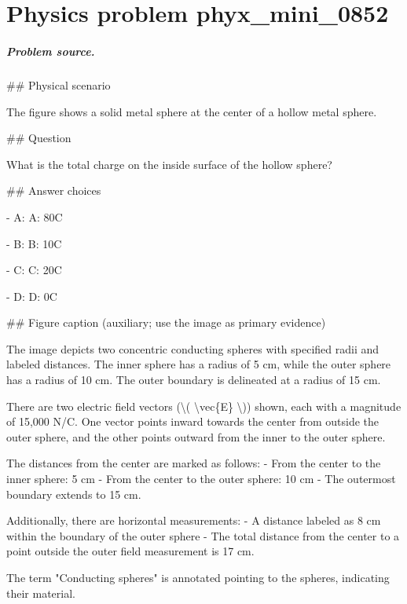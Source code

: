 
\chapter{Physics problem phyx\_mini\_0852}
\label{ch:PhyXMiniProblems_problem_phyx_mini_0852}

\paragraph{Problem source.}
\#\# Physical scenario

The figure shows a solid metal sphere at the center of a hollow metal sphere.

\#\# Question

What is the total charge on the inside surface of the hollow sphere?

\#\# Answer choices

- A: A: 80C

- B: B: 10C

- C: C: 20C

- D: D: 0C

\#\# Figure caption (auxiliary; use the image as primary evidence)

The image depicts two concentric conducting spheres with specified radii and labeled distances. The inner sphere has a radius of 5 cm, while the outer sphere has a radius of 10 cm. The outer boundary is delineated at a radius of 15 cm. 

There are two electric field vectors (\textbackslash{}( \textbackslash{}vec\{E\} \textbackslash{})) shown, each with a magnitude of 15,000 N/C. One vector points inward towards the center from outside the outer sphere, and the other points outward from the inner to the outer sphere.

The distances from the center are marked as follows:
- From the center to the inner sphere: 5 cm
- From the center to the outer sphere: 10 cm
- The outermost boundary extends to 15 cm.

Additionally, there are horizontal measurements:
- A distance labeled as 8 cm within the boundary of the outer sphere
- The total distance from the center to a point outside the outer field measurement is 17 cm.

The term "Conducting spheres" is annotated pointing to the spheres, indicating their material.

